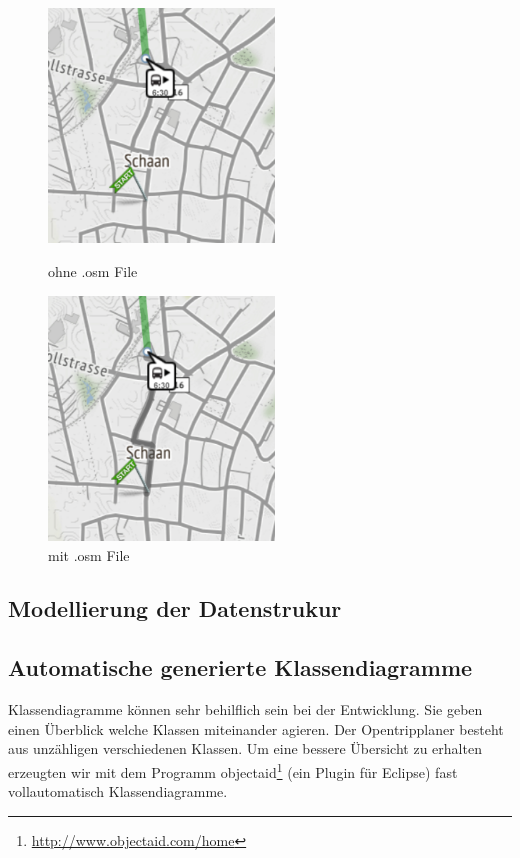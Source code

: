 \begin{figure}[htb]
	\centering
	\begin{minipage}{0.45\linewidth}
		\centering
		\includegraphics[width=6cm]{img/ohneosmfile.png}
		\caption{ohne .osm File}
		\label{fig:ohneosmfile}
	\end{minipage}
	\begin{minipage}{0.45\linewidth}
		\centering
		\includegraphics[width=6cm]{img/mitosmfile.png}
		\caption{mit .osm File}
		\label{fig:mitosmfile}
	\end{minipage}
\end{figure}


\subsection{Modellierung der Datenstrukur}

\subsection{Automatische generierte Klassendiagramme}
Klassendiagramme können sehr behilflich sein bei der Entwicklung. Sie geben einen Überblick welche Klassen miteinander agieren.
Der Opentripplaner besteht aus unzähligen verschiedenen Klassen. Um eine bessere Übersicht zu erhalten erzeugten wir mit dem Programm objectaid\footnote{\url{http://www.objectaid.com/home}} (ein Plugin für Eclipse) fast vollautomatisch Klassendiagramme. 

